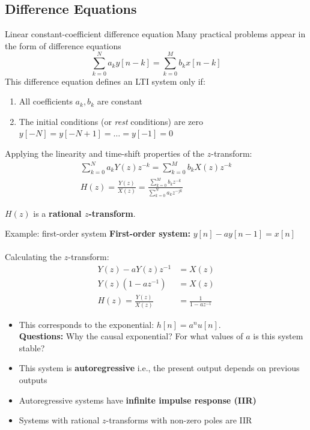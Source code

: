 \documentclass[10pt, handout]{beamer}
\begin{document}
\subsection{Difference Equations}
%
\begin{frame}{Linear constant-coefficient difference equation}
	Many practical problems appear in the form of difference equations
	\begin{equation*}
		\sum_{k=0}^N a_k y[n-k] = \sum_{k=0}^Mb_k x[n-k]
	\end{equation*}
	\pause This difference equation defines an LTI system only if:
	\begin{enumerate}
		\item All coefficients $a_k, b_k$ are constant
		\item The initial conditions (or \textit{rest} conditions) are zero $y[-N] = y[-N+1] =\ldots=y[-1] = 0$
	\end{enumerate}	 
	
	\pause Applying the linearity and time-shift properties of the $z$-transform:
	\begin{align*}
		\sum_{k=0}^N a_kY(z)z^{-k} = \sum_{k=0}^M b_kX(z)z^{-k} \\
		H(z) = \frac{Y(z)}{X(z)} = \frac{\sum_{k=0}^M b_kz^{-k}}{\sum_{k=0}^N a_kz^{-jk}}
	\end{align*}
	
	$H(z)$ is a \textbf{rational $z$-transform}.
\end{frame}

\begin{frame}{Example: first-order system}
	\textbf{First-order system:} $y[n] - ay[n-1] = x[n]$
	~\\
	~\\
	Calculating the $z$-transform:
	\begin{align*}
	Y(z) - aY(z)z^{-1} &= X(z) \\
	Y(z)(1 - az^{-1}) &= X(z) \\
	H(z) = \frac{Y(z)}{X(z)} &= \frac{1}{1 - az^{-1}} 
	\end{align*}
	
	\begin{itemize}
		\pause\item This corresponds to the exponential: $h[n] = a^nu[n]$.\\ \textbf{Questions:} Why the causal exponential? 
		For what values of $a$ is this system stable?
		\pause\item This system is \textbf{autoregressive} i.e., the present output depends on previous outputs
		\pause\item Autoregressive systems have \textbf{infinite impulse response (IIR)}
		\pause\item Systems with rational $z$-transforms with non-zero poles are IIR
	\end{itemize}
	
\end{frame}
\end{document}
